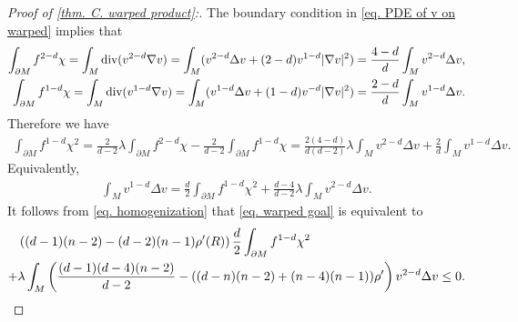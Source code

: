 \documentclass[12pt]{amsart}%
\numberwithin{equation}{section}
\numberwithin{lemma}{section}
\numberwithin{proposition}{section}
\numberwithin{corollary}{section}
\numberwithin{remark}{section}
\begin{document}
\begin{proof}[Proof of \cref{thm. C. warped product}:]
    The boundary  condition in \cref{eq. PDE of v on warped} implies that
    \begin{align}
        \int_{\partial M}f^{2-d}\chi
        =\int_{M}\mathrm{div}(v^{2-d}\nabla v)
        =\int_{M}(v^{2-d}\Delta v+(2-d)v^{1-d}|\nabla v|^2)
        =\frac{4-d}{d}\int_{M}v^{2-d}\Delta v,\notag\\
        \int_{\partial M}f^{1-d}\chi
        =\int_{M}\mathrm{div}(v^{1-d}\nabla v)
        =\int_{M}(v^{1-d}\Delta v+(1-d)v^{-d}|\nabla v|^2)
        =\frac{2-d}{d}\int_{M}v^{1-d}\Delta v.\label{eq. f to 1-d_ chi}
    \end{align}
    Therefore we have
    \begin{align*}
        \int_{\partial M}f^{1-d}\chi^2
        =\frac{2}{d-2}\lambda\int_{\partial M}f^{2-d}\chi
        -\frac{2}{d-2}\int_{\partial M}f^{1-d}\chi
        =\frac{2(4-d)}{d(d-2)}\lambda\int_{M} v^{2-d}\Delta v+\frac{2}{d}\int_{M}v^{1-d}\Delta v.
    \end{align*}
    Equivalently,
    \begin{align}\label{eq. homogenization}
        \int_{M}v^{1-d}\Delta v
        =\frac{d}{2}\int_{\partial M}f^{1-d}\chi^2
        +\frac{d-4}{d-2}\lambda\int_{M}v^{2-d}\Delta v.
    \end{align}
    It follows from \cref{eq. homogenization} that \cref{eq. warped goal}  is equivalent to
    \begin{align}\label{ineq. warped goal 2}
        &\left(
        (d-1)(n-2)-(d-2)(n-1)\rho'(R)
        \right)
        \frac{d}{2}\int_{\partial M} f^{1-d}\chi^2\notag\\
        +&\lambda
        \int_M
        \left(
        \frac{(d-1)(d-4)(n-2)}{d-2}
        -((d-n)(n-2)+(n-4)(n-1))\rho'
        \right)
        v^{2-d}\Delta v\leq 0.
    \end{align}
    


\end{proof}
\end{document}
